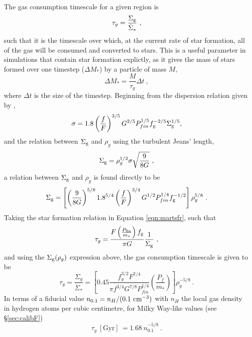 The gas consumption timescale for a given region is
\begin{equation}
\label{eqn:gcdef}
\tau_g = \frac{\Sigma_\mathrm{g}}{\dot{\Sigma}_*}~,
\end{equation}
such that it is the timescale over which, at the current rate of star formation, all of the gas will be consumed and converted to stars.
This is a useful parameter in simulations that contain star formation explictly, as it gives the mass of stars formed over one timestep ($\Delta M_*$) by a particle of mass $M$,
$$
\Delta M_* = \frac{M}{\tau_g} \Delta t~,
$$
where $\Delta t$ is the size of the timestep. Beginning from the dispersion relation given by \citet{martizzi_supernova_2015},
$$
\sigma = 1.8 \left(\frac{f}{F}\right)^{{3/5}} G^{{2/5}} P_{fin}^{{1/5}} f_\mathrm{g}^{{-2/5}} \Sigma_\mathrm{g}^{{1/5}},
$$
and the relation between $\Sigma_\mathrm{g}$ and $\rho_g$ using the turbulent Jeans' length,
$$
\Sigma_\mathrm{g} = \rho_g^{1/2} \sigma \sqrt{\frac{9}{8G}}~,
$$
a relation between $\Sigma_\mathrm{g}$ and $\rho_g$ is found directly to be
\begin{equation}
\label{eqn:sgrhog}
\Sigma_\mathrm{g} = \left[\left(\frac{9}{8G}\right)^{5/8} 1.8^{5/4} \left(\frac{f}{F}\right)^{3/4} G^{1/2} P_{fin}^{1/4} f_\mathrm{g}^{-1/2}\right] \rho_g^{5/8} ~.
\end{equation}
Taking the star formation relation in Equation \ref{eqn:martsfr}, such that
$$
\tau_g = \frac{F\left(\frac{P_\mathrm{fin}}{m_*}\right)f_\mathrm{g}}{\pi G} \frac{1}{\Sigma_\mathrm{g}}~,
$$
and using the $\Sigma_\mathrm{g} ( \rho_g )$ expression above, the gas consumption timescale is given to be
\begin{equation}
\label{eqn:gc}
\tau_{g} = \frac{\Sigma_g}{\dot{\Sigma}_*} = \left[0.45 \frac{f_g^{3/2} F^{7/4}}{\pi f^{3/4} G^{7/8} P_{fin}^{1/4}} \left(\frac{P_{f}}{m_*}\right)\right] \rho_g^{-5/8}~.
\end{equation}
In terms of a fiducial value $n_{0.1} = n_H/(0.1 ~\mathrm{cm}^{-3})$ with $n_H$ the local gas density in hydrogen atoms per cubic centimetre, for Milky Way-like values (see \S \ref{sec:calibF})
\begin{equation}
    \tau_{g} ~ [\mathrm{Gyr}] ~ = 1.68  ~ n_{0.1}^{-5/8}~.
\end{equation}

